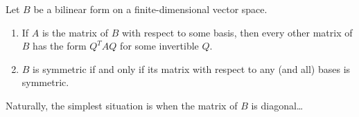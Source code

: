 \begin{lemm}{}{}
Let $B$ be a bilinear form on a finite-dimensional vector space.
\begin{enumerate}
  \item If $A$ is the matrix of $B$ with respect to some basis, then every other matrix of $B$ has the form $Q^TAQ$ for some invertible $Q$.
  \item $B$ is symmetric if and only if its matrix with respect to any (and all) bases is symmetric.
\end{enumerate}
\end{lemm}

Naturally, the simplest situation is when the matrix of $B$ is diagonal\ldots
\goodbreak

